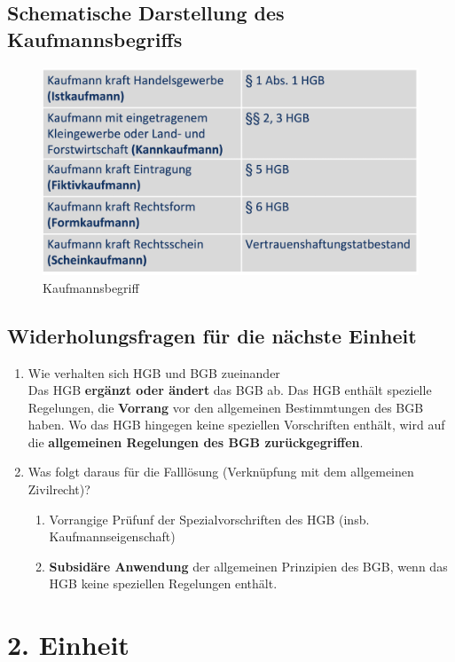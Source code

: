 \documentclass[a4paper, 10pt]{article}
\begin{document}
\subsection{Schematische Darstellung des Kaufmannsbegriffs}
\begin{figure}[h]
    \centering
    \includegraphics[width=0.5\linewidth]{Bildschirmfoto 2024-10-30 um 12.09.16.png}
    \caption{Kaufmannsbegriff}
    \label{fig:enter-label}
\end{figure}
\subsection{Widerholungsfragen für die nächste Einheit}
\begin{enumerate}
    \item Wie verhalten sich HGB und BGB zueinander\\[2.5mm]
    Das HGB \textbf{ergänzt oder ändert} das BGB ab. Das HGB enthält spezielle Regelungen, die \textbf{Vorrang} vor den allgemeinen Bestimmtungen des BGB haben. Wo das HGB hingegen keine speziellen Vorschriften enthält, wird auf die \textbf{allgemeinen Regelungen des BGB zurückgegriffen}.

    \item Was folgt daraus für die Falllösung (Verknüpfung mit dem
allgemeinen Zivilrecht)?
\begin{enumerate}
    \item Vorrangige Prüfunf der Spezialvorschriften des HGB (insb. Kaufmannseigenschaft)
    \item \textbf{Subsidäre Anwendung} der allgemeinen Prinzipien des BGB, wenn das HGB keine speziellen Regelungen enthält.
\end{enumerate}

\end{enumerate}
\section{2. Einheit}
\end{document}
